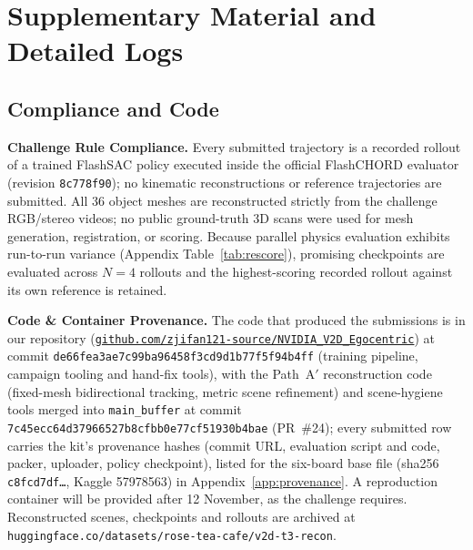 \documentclass[10pt]{nvidiaextabstract}
\begin{document}
\section{Supplementary Material and Detailed Logs}
\label{sec:appendix}

\subsection{Compliance and Code}
\label{sec:compliance}
\textbf{Challenge Rule Compliance.} Every submitted trajectory is a recorded rollout of a trained FlashSAC policy executed inside the official FlashCHORD evaluator (revision \texttt{8c778f90}); no kinematic reconstructions or reference trajectories are submitted. All 36 object meshes are reconstructed strictly from the challenge RGB/stereo videos; no public ground-truth 3D scans were used for mesh generation, registration, or scoring. Because parallel physics evaluation exhibits run-to-run variance (Appendix Table~\ref{tab:rescore}), promising checkpoints are evaluated across $N=4$ rollouts and the highest-scoring recorded rollout against its own reference is retained.

\textbf{Code \& Container Provenance.} The code that produced the submissions is in our repository (\href{https://github.com/zjifan121-source/NVIDIA_V2D_Egocentric}{\texttt{github.com/\allowbreak zjifan121-source/\allowbreak NVIDIA\_V2D\_Egocentric}}) at commit \texttt{de66fea3ae7c99ba96458f3cd9d1b77f5f94b4ff} (training pipeline, campaign tooling and hand-fix tools), with the Path~A$'$ reconstruction code (fixed-mesh bidirectional tracking, metric scene refinement) and scene-hygiene tools merged into \texttt{main\_buffer} at commit \texttt{7c45ecc6\allowbreak 4d379665\allowbreak 27b8cfbb\allowbreak 0e77cf51\allowbreak 930b4bae} (PR~\#24); every submitted row carries the kit's provenance hashes (commit URL, evaluation script and code, packer, uploader, policy checkpoint), listed for the six-board base file (sha256 \texttt{c8fcd7df\ldots}, Kaggle 57978563) in Appendix~\ref{app:provenance}. A reproduction container will be provided after 12 November, as the challenge requires. Reconstructed scenes, checkpoints and rollouts are archived at \texttt{huggingface.co/\allowbreak datasets/\allowbreak rose-tea-cafe/\allowbreak v2d-t3-recon}.
\end{document}
